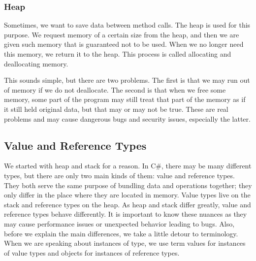 \subsubsection{Heap}
Sometimes, we want to save data between method calls. The heap is used for this purpose. We request memory of a certain size from the heap, and then we are given such memory that is guaranteed not to be used. When we no longer need this memory, we return it to the heap. This process is called allocating and deallocating memory.

This sounds simple, but there are two problems. The first is that we may run out of memory if we do not deallocate. The second is that when we free some memory, some part of the program may still treat that part of the memory as if it still held original data, but that may or may not be true. These are real problems and may cause dangerous bugs and security issues, especially the latter.

\subsection{Value and Reference Types}

We started with heap and stack for a reason. In C\#, there may be many different types, but there are only two main kinds of them: value and reference types. They both serve the same purpose of bundling data and operations together; they only differ in the place where they are located in memory. Value types live on the stack and reference types on the heap. As heap and stack differ greatly, value and reference types behave differently. It is important to know these nuances as they may cause performance issues or unexpected behavior leading to bugs. Also, before we explain the main differences, we take a little detour to terminology. When we are speaking about instances of type, we use term values for instances of value types and objects for instances of reference types.

